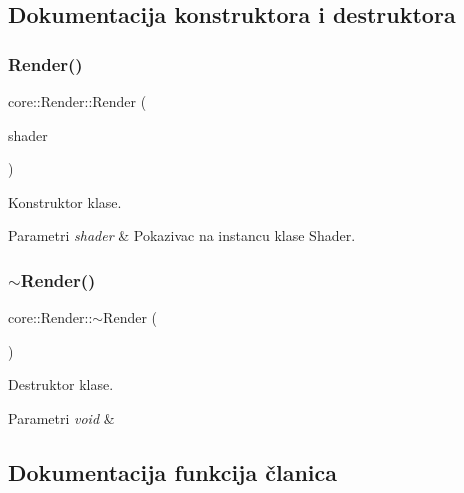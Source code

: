 \subsection{Dokumentacija konstruktora i destruktora}
\mbox{\label{classcore_1_1Render_ab101784fcf9fdb1f8f86b026fd47c2f6}} 
\subsubsection{\texorpdfstring{Render()}{Render()}}
{\footnotesize\ttfamily core\+::\+Render\+::\+Render (\begin{DoxyParamCaption}\item[{\hyperlink{classshader_1_1Shader}{Shader} $\ast$}]{shader }\end{DoxyParamCaption})}



Konstruktor klase. 


\begin{DoxyParams}{Parametri}
{\em shader} & Pokazivac na instancu klase Shader. \\
\hline
\end{DoxyParams}
\mbox{\label{classcore_1_1Render_ac11786f4406333b24a33b61c5e2506f4}} 
\subsubsection{\texorpdfstring{$\sim$\+Render()}{~Render()}}
{\footnotesize\ttfamily core\+::\+Render\+::$\sim$\+Render (\begin{DoxyParamCaption}{ }\end{DoxyParamCaption})}



Destruktor klase. 


\begin{DoxyParams}{Parametri}
{\em void} & \\
\hline
\end{DoxyParams}


\subsection{Dokumentacija funkcija članica}
\mbox{\label{classcore_1_1Render_af0c1d960dc3ca1bab8abc1302d04c254}} 
